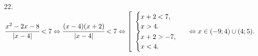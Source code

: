 22. $\cfrac{x^2-2x-8}{|x-4|}<7\Leftrightarrow\cfrac{(x-4)(x+2)}{|x-4|}<7\Leftrightarrow \left[\begin{array}{l} \begin{cases}x+2<7,\\ x>4.\end{cases}\\
\begin{cases}x+2>-7,\\ x<4.\end{cases}\end{array}\right.\Leftrightarrow  x\in (-9;4)\cup(4;5).$\\
